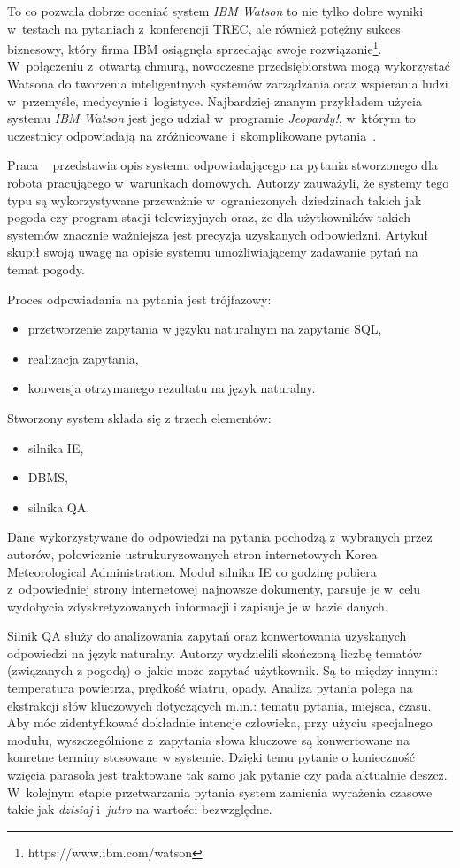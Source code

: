 To co pozwala dobrze oceniać system \emph{IBM Watson} to nie tylko dobre wyniki w~testach na pytaniach z~konferencji TREC, ale również potężny sukces biznesowy, który firma IBM osiągnęła sprzedając swoje rozwiązanie\footnote{https://www.ibm.com/watson}. W~połączeniu z~otwartą chmurą, nowoczesne przedsiębiorstwa mogą wykorzystać Watsona do tworzenia inteligentnych systemów zarządzania oraz wspierania ludzi w~przemyśle, medycynie i~logistyce. Najbardziej znanym przykładem użycia systemu \emph{IBM Watson} jest jego udział w~programie \emph{Jeopardy!}, w~którym to uczestnicy odpowiadają na zróżnicowane i~skomplikowane pytania~\cite{lapshin2012question}. 


Praca ~\cite{restrictedWeather} przedstawia opis systemu odpowiadającego na pytania stworzonego dla robota pracującego w~warunkach domowych. Autorzy zauważyli, że systemy tego typu są wykorzystywane przeważnie w~ograniczonych dziedzinach takich jak pogoda czy program stacji telewizyjnych oraz, że dla użytkowników takich systemów znacznie ważniejsza jest precyzja uzyskanych odpowiedzni. Artykuł skupił swoją uwagę na opisie systemu umożliwiającemy zadawanie pytań na temat pogody. 

Proces odpowiadania na pytania jest trójfazowy: 
\begin{itemize}
	\item przetworzenie zapytania w języku naturalnym na zapytanie SQL,
	\item realizacja zapytania,
	\item konwersja otrzymanego rezultatu na język naturalny.
\end{itemize}
Stworzony system składa się z trzech elementów: 
\begin{itemize}
	\item silnika IE, 
	\item DBMS, 
	\item silnika QA.
\end{itemize}

Dane wykorzystywane do odpowiedzi na pytania pochodzą z~wybranych przez autorów, połowicznie ustrukuryzowanych stron internetowych Korea Meteorological Administration. Moduł silnika IE co godzinę pobiera z~odpowiedniej strony internetowej najnowsze dokumenty, parsuje je w~celu wydobycia zdyskretyzowanych informacji i zapisuje je w bazie danych. 

Silnik QA służy do analizowania zapytań oraz konwertowania uzyskanych odpowiedzi na język naturalny. Autorzy \cite{restrictedWeather} wydzielili skończoną liczbę tematów (związanych z pogodą) o~jakie może zapytać użytkownik. Są to między innymi: temperatura powietrza, prędkość wiatru, opady. Analiza pytania polega na ekstrakcji słów kluczowych dotyczących m.in.: tematu pytania, miejsca, czasu. Aby móc zidentyfikować dokładnie intencje człowieka, przy użyciu specjalnego modułu, wyszczególnione z~zapytania słowa kluczowe są konwertowane na konretne terminy stosowane w systemie. Dzięki temu pytanie o konieczność wzięcia parasola jest traktowane tak samo jak pytanie czy pada aktualnie deszcz. W~kolejnym etapie przetwarzania pytania system zamienia wyrażenia czasowe takie jak \textit{dzisiaj} i~\textit{jutro} na wartości bezwzględne.

